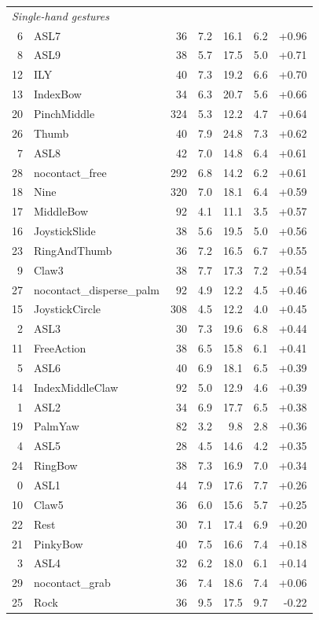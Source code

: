 \documentclass{article}
\begin{document}
\begin{table}[h]
\begin{tabular}{rlrrrrr}
\multicolumn{7}{l}{\textit{Single-hand gestures}} \\
6  & ASL7                    & 36  & 7.2 & 16.1 & 6.2 & +0.96 \\
8  & ASL9                    & 38  & 5.7 & 17.5 & 5.0 & +0.71 \\
12 & ILY                     & 40  & 7.3 & 19.2 & 6.6 & +0.70 \\
13 & IndexBow                & 34  & 6.3 & 20.7 & 5.6 & +0.66 \\
20 & PinchMiddle             & 324 & 5.3 & 12.2 & 4.7 & +0.64 \\
26 & Thumb                   & 40  & 7.9 & 24.8 & 7.3 & +0.62 \\
7  & ASL8                    & 42  & 7.0 & 14.8 & 6.4 & +0.61 \\
28 & nocontact\_free          & 292 & 6.8 & 14.2 & 6.2 & +0.61 \\
18 & Nine                    & 320 & 7.0 & 18.1 & 6.4 & +0.59 \\
17 & MiddleBow               & 92  & 4.1 & 11.1 & 3.5 & +0.57 \\
16 & JoystickSlide           & 38  & 5.6 & 19.5 & 5.0 & +0.56 \\
23 & RingAndThumb            & 36  & 7.2 & 16.5 & 6.7 & +0.55 \\
9  & Claw3                   & 38  & 7.7 & 17.3 & 7.2 & +0.54 \\
27 & nocontact\_disperse\_palm & 92 & 4.9 & 12.2 & 4.5 & +0.46 \\
15 & JoystickCircle          & 308 & 4.5 & 12.2 & 4.0 & +0.45 \\
2  & ASL3                    & 30  & 7.3 & 19.6 & 6.8 & +0.44 \\
11 & FreeAction              & 38  & 6.5 & 15.8 & 6.1 & +0.41 \\
5  & ASL6                    & 40  & 6.9 & 18.1 & 6.5 & +0.39 \\
14 & IndexMiddleClaw         & 92  & 5.0 & 12.9 & 4.6 & +0.39 \\
1  & ASL2                    & 34  & 6.9 & 17.7 & 6.5 & +0.38 \\
19 & PalmYaw                 & 82  & 3.2 & 9.8  & 2.8 & +0.36 \\
4  & ASL5                    & 28  & 4.5 & 14.6 & 4.2 & +0.35 \\
24 & RingBow                 & 38  & 7.3 & 16.9 & 7.0 & +0.34 \\
0  & ASL1                    & 44  & 7.9 & 17.6 & 7.7 & +0.26 \\
10 & Claw5                   & 36  & 6.0 & 15.6 & 5.7 & +0.25 \\
22 & Rest                    & 30  & 7.1 & 17.4 & 6.9 & +0.20 \\
21 & PinkyBow                & 40  & 7.5 & 16.6 & 7.4 & +0.18 \\
3  & ASL4                    & 32  & 6.2 & 18.0 & 6.1 & +0.14 \\
29 & nocontact\_grab          & 36  & 7.4 & 18.6 & 7.4 & +0.06 \\
25 & Rock                    & 36  & 9.5 & 17.5 & 9.7 & -0.22 \\


\end{tabular}
\end{table}
\end{document}
